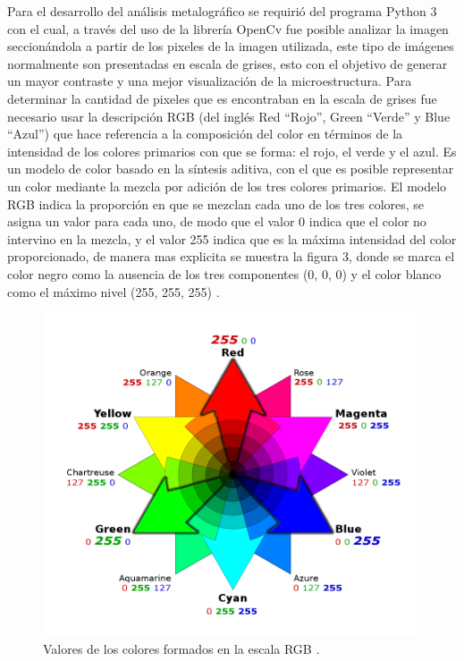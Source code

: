 \documentclass[12pt,twocolumn]{article}
\begin{document}
Para el desarrollo del an\'alisis metalogr\'afico se requiri\'o del programa Python 3 con el cual, a trav\'es del uso de la librer\'ia OpenCv fue posible analizar la imagen seccion\'andola a partir de los pixeles de la imagen utilizada, este tipo de im\'agenes normalmente son presentadas en escala de grises, esto con el objetivo de generar un mayor contraste y una mejor visualizaci\'on de la microestructura. Para determinar la cantidad de pixeles que es encontraban en la escala de grises fue necesario usar la descripci\'on RGB (del ingl\'es Red ``Rojo'', Green  ``Verde'' y Blue  ``Azul'') que hace referencia a la composici\'on del color en t\'erminos de la intensidad de los colores primarios con que se forma: el rojo, el verde y el azul. Es un modelo de color basado en la s\'intesis aditiva, con el que es posible representar un color mediante la mezcla por adici\'on de los tres colores primarios.
El modelo RGB indica la proporci\'on en que se mezclan cada uno de los tres colores, se asigna un valor para cada uno, de modo que el valor 0 indica que el color no intervino en la mezcla, y el valor 255 indica que es la m\'axima intensidad del color proporcionado, de manera mas explicita se muestra la figura 3, donde se marca el color negro como la ausencia de los tres componentes (0, 0, 0) y el color blanco como el m\'aximo nivel (255, 255, 255) \cite{ref7}.

\begin{figure}[H]
  \centering\includegraphics[scale=0.15]{coloresrgb.png}
  \caption{Valores de los colores formados en la escala RGB \cite{ref7}.}
  \label{fig}
\end{figure}
\end{document}
